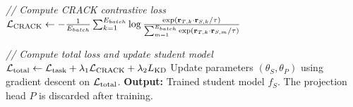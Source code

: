 \documentclass{article}
\begin{document}
\begin{algorithm}[H]
\begin{algorithmic}[1]
            \STATE \textit{// Compute CRACK contrastive loss}
            \STATE $\mathcal{L}_{\text{CRACK}} \leftarrow - \frac{1}{E_{batch}} \sum_{k=1}^{E_{batch}} \log \frac{\exp(\mathbf{r}_{T,k} \cdot \mathbf{r}_{S,k} / \tau)}{\sum_{m=1}^{E_{batch}} \exp(\mathbf{r}_{T,k} \cdot \mathbf{r}_{S,m} / \tau)}$
            
            \STATE \textit{// Compute total loss and update student model}
            \STATE $\mathcal{L}_{\text{total}} \leftarrow \mathcal{L}_{\text{task}} + \lambda_1 \mathcal{L}_{\text{CRACK}} + \lambda_2 L_{\text{KD}}$
            \STATE Update parameters $(\theta_S, \theta_P)$ using gradient descent on $\mathcal{L}_{\text{total}}$.
        \ENDFOR
    \ENDFOR
    \STATE \textbf{Output:} Trained student model $f_S$. The projection head $P$ is discarded after training.
    \end{algorithmic}
\end{algorithm}

\end{document}
